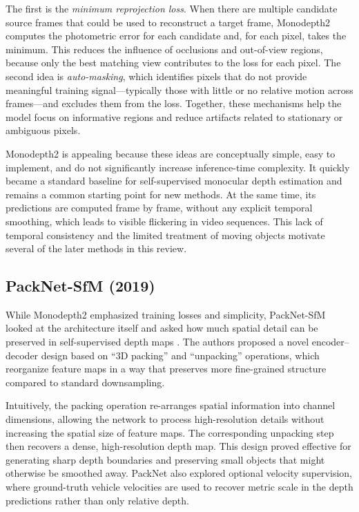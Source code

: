 \documentclass[10pt,twocolumn,letterpaper]{article}
\begin{document}
The first is the \textit{minimum reprojection loss}. When there are multiple candidate source frames that could be used to reconstruct a target frame, Monodepth2 computes the photometric error for each candidate and, for each pixel, takes the minimum. This reduces the influence of occlusions and out-of-view regions, because only the best matching view contributes to the loss for each pixel. The second idea is \textit{auto-masking}, which identifies pixels that do not provide meaningful training signal—typically those with little or no relative motion across frames—and excludes them from the loss. Together, these mechanisms help the model focus on informative regions and reduce artifacts related to stationary or ambiguous pixels.

Monodepth2 is appealing because these ideas are conceptually simple, easy to implement, and do not significantly increase inference-time complexity. It quickly became a standard baseline for self-supervised monocular depth estimation and remains a common starting point for new methods. At the same time, its predictions are computed frame by frame, without any explicit temporal smoothing, which leads to visible flickering in video sequences. This lack of temporal consistency and the limited treatment of moving objects motivate several of the later methods in this review.

\subsection{PackNet-SfM (2019)}

While Monodepth2 emphasized training losses and simplicity, PackNet-SfM looked at the architecture itself and asked how much spatial detail can be preserved in self-supervised depth maps \cite{guizilini20203d}. The authors proposed a novel encoder–decoder design based on ``3D packing'' and ``unpacking'' operations, which reorganize feature maps in a way that preserves more fine-grained structure compared to standard downsampling.

Intuitively, the packing operation re-arranges spatial information into channel dimensions, allowing the network to process high-resolution details without increasing the spatial size of feature maps. The corresponding unpacking step then recovers a dense, high-resolution depth map. This design proved effective for generating sharp depth boundaries and preserving small objects that might otherwise be smoothed away. PackNet also explored optional velocity supervision, where ground-truth vehicle velocities are used to recover metric scale in the depth predictions rather than only relative depth.
\end{document}
